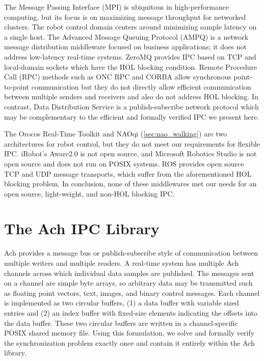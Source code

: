 \documentclass[letterpaper]{IEEEtran}
\begin{document}
The Message Passing Interface (MPI) \cite{gropp1999using} is
ubiquitous in high-performance computing, but its focus is on
maximizing message throughput for networked clusters.  The robot
control domain centers around minimizing sample latency on a single
host.  The Advanced Message Queuing Protocol (AMPQ)
\cite{vinoski2006advanced} is a network message distribution
middleware focused on business applications; it does not address
low-latency real-time systems.  ZeroMQ \cite{zeromq} provides IPC
based on TCP and local-domain sockets which have the HOL blocking
condition.  Remote Procedure Call (RPC) methods such as ONC RPC
\cite{oncrpc} and CORBA \cite{corba} allow synchronous point-to-point
communication but they do not directly allow efficient communication
between multiple senders and receivers and also do not address HOL
blocking.  In contrast, Data Distribution Service \cite{dds2007} is a
publish-subscribe network protocol which may be complementary to the
efficient and formally verified IPC we present here.

The Orocos Real-Time Toolkit \cite{bruyninckx2003real} and NAOqi
\cite{agüero2010behavior} (\autoref{sec:nao_walking}) are two
architectures for robot control, but they do not meet our requirements
for flexible IPC.  iRobot's Aware2.0 is not open source, and Microsoft
Robotics Studio is not open source and does not run on POSIX systems.
ROS \cite{Quigley09} provides open source TCP and UDP message
transports, which suffer from the aforementioned HOL blocking problem.
In conclusion, none of these middlewares met our needs for an open
source, light-weight, and non-HOL blocking IPC.


\section{The Ach IPC Library}

\label{sect:ach}

Ach provides a message bus or publish-subscribe style of communication
between multiple writers and multiple readers.  A real-time system has
multiple Ach channels across which individual data samples are
published.  The messages sent on a channel are simple byte arrays, so
arbitrary data may be transmitted such as floating point vectors,
text, images, and binary control messages.  Each channel is
implemented as two circular buffers, (1) a data buffer with variable
sized entries and (2) an index buffer with fixed-size elements
indicating the offsets into the data buffer. These two circular
buffers are written in a channel-specific POSIX shared memory
file. Using this formulation, we solve and formally verify the
synchronization problem exactly once and contain it entirely within
the Ach library.
\end{document}
